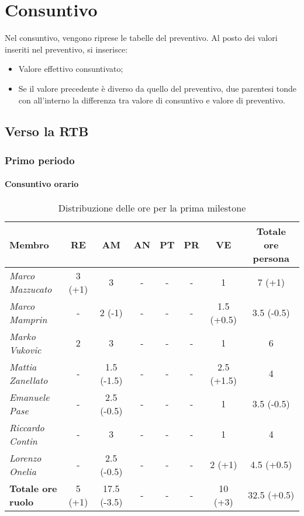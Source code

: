 \chapter{Consuntivo}

Nel consuntivo, vengono riprese le tabelle del preventivo. Al posto dei valori inseriti nel preventivo, si inserisce:
\begin{itemize}
    \item Valore effettivo consuntivato;
    \item Se il valore precedente è diverso da quello del preventivo, due parentesi tonde con all'interno
        la differenza tra valore di consuntivo e valore di preventivo.
\end{itemize}

\section{Verso la RTB}

\subsection{Primo periodo}

\subsubsection{Consuntivo orario}
\begin{table}[!ht]
    \centering
    \begin{tabular}{|l|c|c|c|c|c|c|c|}
    \hline
    \textbf{Membro} & \multicolumn{1}{c|}{\textbf{RE}} & \multicolumn{1}{c|}{\textbf{AM}} & \multicolumn{1}{c|}{\textbf{AN}} & \multicolumn{1}{c|}{\textbf{PT}} & \multicolumn{1}{c|}{\textbf{PR}} & \multicolumn{1}{c|}{\textbf{VE}} & \multicolumn{1}{c|}{\textbf{Totale ore persona}} \\ \hline
    \textit{Marco Mazzucato}  & 3 (+1) & 3          & - & - & - & 1         & 7 (+1)   \\ \hline
    \textit{Marco Mamprin}    & -      & 2 (-1)     & - & - & - & 1.5 (+0.5)& 3.5 (-0.5) \\ \hline
    \textit{Marko Vukovic}    & 2      & 3          & - & - & - & 1         & 6        \\ \hline
    \textit{Mattia Zanellato} & -      & 1.5 (-1.5) & - & - & - & 2.5 (+1.5)& 4        \\ \hline
    \textit{Emanuele Pase}    & -      & 2.5 (-0.5) & - & - & - & 1         & 3.5 (-0.5) \\ \hline
    \textit{Riccardo Contin}  & -      & 3          & - & - & - & 1         & 4        \\ \hline
    \textit{Lorenzo Onelia}   & -      & 2.5 (-0.5) & - & - & - & 2 (+1)    & 4.5 (+0.5) \\ \hline
    \textbf{Totale ore ruolo} & 5 (+1) & 17.5 (-3.5)& - & - & - & 10 (+3)   & 32.5 (+0.5)\\ \hline
    \end{tabular}
    \caption{Distribuzione delle ore per la prima milestone}
\end{table}

